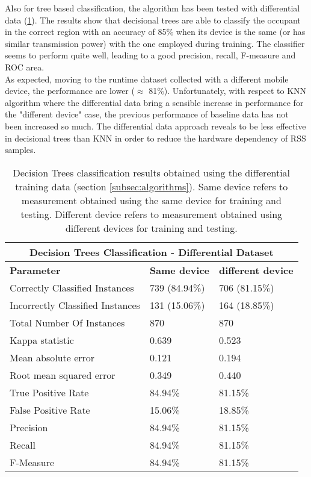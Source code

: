 Also for tree based classification, the algorithm has been tested with differential data (\ref{tab:tree-diff}).
The results show that decisional trees are able to classify the occupant in the correct region with an accuracy of 85\% when its device is the same (or has similar transmission power) with the one employed during training.
The classifier seems to perform quite well, leading to a good precision, recall, F-measure and ROC area.\\
As expected, moving to the runtime dataset collected with a different mobile device, the performance are lower ($\approx$ 81\%). Unfortunately, with respect to KNN algorithm where the differential data bring a sensible increase in performance for the "different device" case, the previous performance of baseline data has not been increased so much. The differential data approach reveals to be less effective in decisional trees than KNN in order to reduce the hardware dependency of RSS samples.

\begin{table}
\caption[Decision Trees classification results obtained using the differential training data.]{Decision Trees classification results obtained using the differential training data (section \ref{subsec:algorithms}). Same device refers to measurement obtained using the same device for training and testing. Different device refers to measurement obtained using different devices for training and testing.}
\label{tab:tree-diff}
\begin{tabular}{ |l|l|l| }
  \hline
  \multicolumn{3}{|c|}{\textbf{Decision Trees Classification - Differential Dataset}} \\
  \hline
  \textbf{Parameter} & \textbf{Same device} & \textbf{different device}\\
  \hline
  Correctly Classified Instances & 739 (84.94\%) & 706 (81.15\%) \\
  Incorrectly Classified Instances & 131 (15.06\%) & 164 (18.85\%) \\
  Total Number Of Instances & 870 & 870 \\
  Kappa statistic & 0.639 & 0.523 \\
  Mean absolute error & 0.121 & 0.194 \\
  Root mean squared error & 0.349 & 0.440 \\
  True Positive Rate & 84.94\% & 81.15\% \\
  False Positive Rate & 15.06\% & 18.85\% \\
  Precision & 84.94\% & 81.15\% \\
  Recall & 84.94\% & 81.15\% \\
  F-Measure & 84.94\% & 81.15\% \\
  \hline
\end{tabular}
\end{table}


